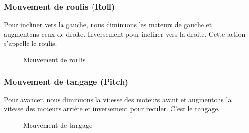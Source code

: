 \subsubsection{Mouvement de roulis (Roll)}
Pour incliner vers la gauche, nous diminuons les moteurs de gauche et augmentons ceux de droite. Inversement pour incliner vers la droite. Cette action s'appelle le roulis.
\begin{figure} [H]
\begin{center}
	
	\caption{Mouvement de roulis}
\end{center}
\end{figure}
\subsubsection{Mouvement de tangage (Pitch)}
Pour avancer, nous diminuons la vitesse des moteurs avant et augmentons la vitesse des moteurs arrière et inversement pour reculer. C'est le tangage.


\begin{figure}[H] 
\begin{center}
	\centering
\end{center}
\caption{Mouvement de tangage}
\end{figure}


